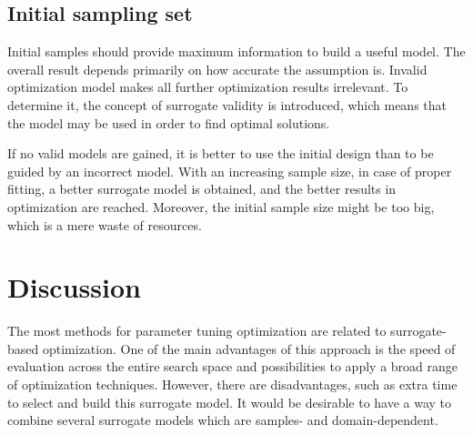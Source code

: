         \subsection{Initial sampling set}
        Initial samples should provide maximum information to build a useful model. The overall result depends primarily on how accurate the assumption is. Invalid optimization model makes all further optimization results irrelevant. To determine it, the concept of surrogate validity is introduced, which means that the model may be used in order to find optimal solutions.

        If no valid models are gained, it is better to use the initial design than to be guided by an incorrect model. With an increasing sample size, in case of proper fitting, a better surrogate model is obtained, and the better results in optimization are reached. Moreover, the initial sample size might be too big, which is a mere waste of resources.  


    \section{Discussion}
    The most methods for parameter tuning optimization are related to surrogate-based optimization. One of the main advantages of this approach is the speed of evaluation across the entire search space and possibilities to apply a broad range of optimization techniques. However, there are disadvantages, such as extra time to select and build this surrogate model. 
    It would be desirable to have a way to combine several surrogate models which are samples- and domain-dependent.



